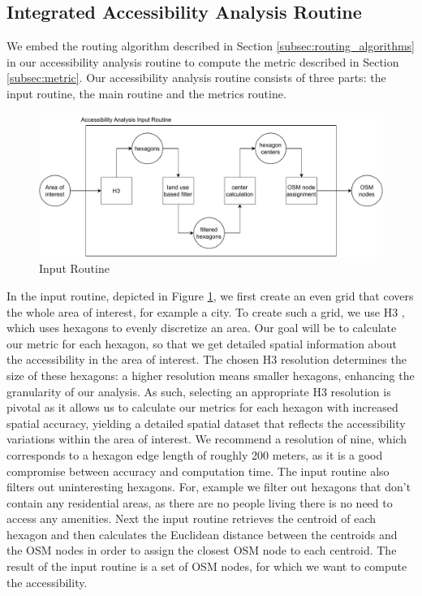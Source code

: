 \subsection{Integrated Accessibility Analysis Routine}
\label{subsec:combining}

We embed the routing algorithm described in Section \ref{subsec:routing_algorithms} in our accessibility analysis routine to compute the metric described in Section \ref{subsec:metric}.
Our accessibility analysis routine consists of three parts: the input routine, the main routine and the metrics routine.

\begin{figure}
    \centering
    \includegraphics[scale=0.60]{Figures/method/input_routine}
    \caption{Input Routine}
    \label{fig:input_routine}
\end{figure}
In the input routine, depicted in Figure \ref{fig:input_routine}, we first create an even grid that covers the whole area of interest, for example a city.
To create such a grid, we use H3 , which uses hexagons to evenly discretize an area.
Our goal will be to calculate our metric for each hexagon, so that we get detailed spatial information about the accessibility in the area of interest.
The chosen H3 resolution determines the size of these hexagons: a higher resolution means smaller hexagons, enhancing the granularity of our analysis. 
As such, selecting an appropriate H3 resolution is pivotal as it allows us to calculate our metrics for each hexagon with increased spatial accuracy, yielding a detailed spatial dataset that reflects the accessibility variations within the area of interest.
We recommend a resolution of nine, which corresponds to a hexagon edge length of roughly 200 meters, as it is a good compromise between accuracy and computation time.
The input routine also filters out uninteresting hexagons.
For, example we filter out hexagons that don't contain any residential areas, as there are no people living there is no need to access any amenities.
Next the input routine retrieves the centroid of each hexagon and then calculates the Euclidean distance between the centroids and the OSM nodes in order to assign the closest OSM node to each centroid.
The result of the input routine is a set of OSM nodes, for which we want to compute the accessibility.

